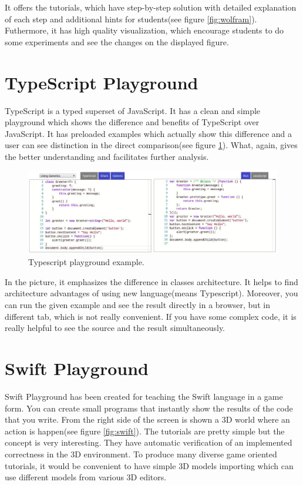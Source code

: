 It offers the tutorials, which have step-by-step solution with detailed explanation of each step and additional hints for students(see figure \ref{fig:wolfram}). Futhermore, it has high quality visualization, which encourage students to do some experiments and see the changes on the displayed figure.

\section{TypeScript Playground} \label{sec:typescript}
TypeScript is a typed superset of JavaScript. It has a clean and simple playground which shows the difference and benefits of TypeScript over JavaScript. It has preloaded examples which actually show this difference and a user can see distinction in the direct comparison(see figure \ref{fig:typescript}). What, again, gives the better understanding and facilitates further analysis.

\begin{figure}[h!]
    \centering
    \includegraphics[width=\linewidth]{src/pic/typescript}
    \caption{Typescript playground example.}
    \label{fig:typescript}
\end{figure}

In the picture, it emphasizes the difference in classes architecture. It helps to find architecture advantages of using new language(means Typescript). Moreover, you can run the given example and see the result directly in a browser, but in different tab, which is not really convenient. If you have some complex code, it is really helpful to see the source and the result simultaneously.

\section{Swift Playground} \label{sec:swift}
Swift Playground has been created for teaching the Swift language in a game form. You can create small programs that instantly show the results of the code that you write. From the right side of the screen is shown a 3D world where an action is happen(see figure \ref{fig:swift}). The tutorials are pretty simple but the concept is very interesting. They have automatic verification of an implemented correctness in the 3D environment. To produce many diverse game oriented tutorials, it would be convenient to have simple 3D models importing which can use different models from various 3D editors.

